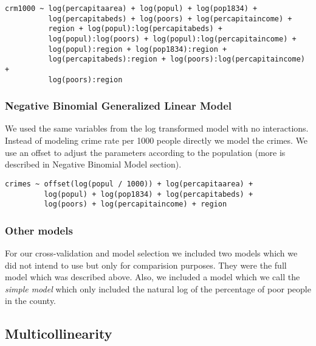 \documentclass[]{article}
\begin{document}
\begin{verbatim}
crm1000 ~ log(percapitaarea) + log(popul) + log(pop1834) +
          log(percapitabeds) + log(poors) + log(percapitaincome) +
          region + log(popul):log(percapitabeds) +
          log(popul):log(poors) + log(popul):log(percapitaincome) +
          log(popul):region + log(pop1834):region +
          log(percapitabeds):region + log(poors):log(percapitaincome) +
          log(poors):region
\end{verbatim}

\subsubsection{Negative Binomial Generalized Linear
Model}\label{negative-binomial-generalized-linear-model}

We used the same variables from the log transformed model with no
interactions. Instead of modeling crime rate per 1000 people directly we
model the crimes. We use an offset to adjust the parameters according to
the population (more is described in Negative Binomial Model section).

\begin{verbatim}
crimes ~ offset(log(popul / 1000)) + log(percapitaarea) +
         log(popul) + log(pop1834) + log(percapitabeds) +
         log(poors) + log(percapitaincome) + region
\end{verbatim}

\subsubsection{Other models}\label{other-models}

For our cross-validation and model selection we included two models
which we did not intend to use but only for comparision purposes. They
were the full model which was described above. Also, we included a model
which we call the \emph{simple model} which only included the natural
log of the percentage of poor people in the county.

\subsection{Multicollinearity}\label{multicollinearity}
\end{document}
